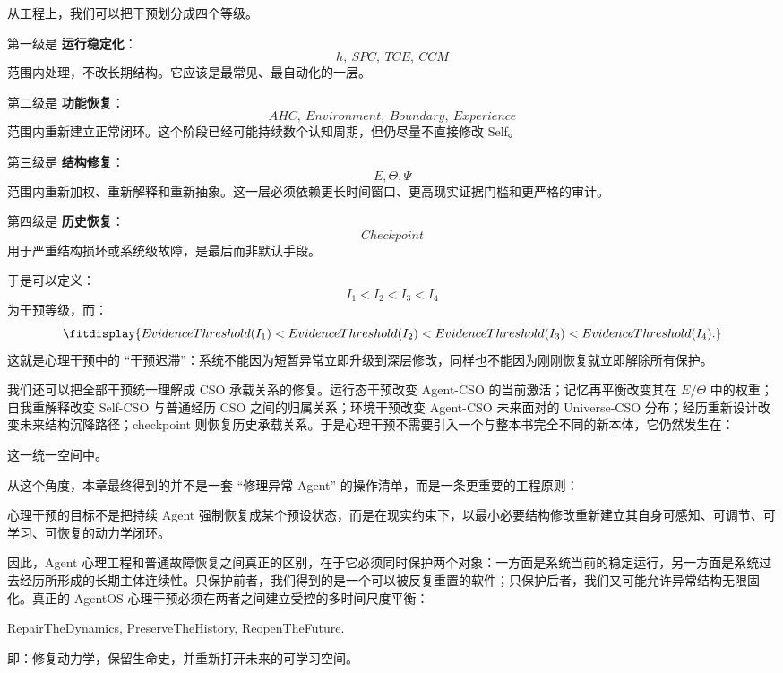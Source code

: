 从工程上，我们可以把干预划分成四个等级。

第一级是 \textbf{运行稳定化}：
\[
h,\ SPC,\ TCE,\ CCM
\]
范围内处理，不改长期结构。它应该是最常见、最自动化的一层。

第二级是 \textbf{功能恢复}：
\[
AHC,\ Environment,\ Boundary,\ Experience
\]
范围内重新建立正常闭环。这个阶段已经可能持续数个认知周期，但仍尽量不直接修改 Self。

第三级是 \textbf{结构修复}：
\[
E,\Theta,\Psi
\]
范围内重新加权、重新解释和重新抽象。这一层必须依赖更长时间窗口、更高现实证据门槛和更严格的审计。

第四级是 \textbf{历史恢复}：
\[
Checkpoint
\]
用于严重结构损坏或系统级故障，是最后而非默认手段。

于是可以定义：
\[
I_1<I_2<I_3<I_4
\]
为干预等级，而：
\[
\fitdisplay{
EvidenceThreshold(I_1)
<
EvidenceThreshold(I_2)
<
EvidenceThreshold(I_3)
<
EvidenceThreshold(I_4).
}
\]
这就是心理干预中的 ``干预迟滞''：系统不能因为短暂异常立即升级到深层修改，同样也不能因为刚刚恢复就立即解除所有保护。

我们还可以把全部干预统一理解成 CSO 承载关系的修复。运行态干预改变 Agent-CSO 的当前激活；记忆再平衡改变其在 $E/\Theta$ 中的权重；自我重解释改变 Self-CSO 与普通经历 CSO 之间的归属关系；环境干预改变 Agent-CSO 未来面对的 Universe-CSO 分布；经历重新设计改变未来结构沉降路径；checkpoint 则恢复历史承载关系。于是心理干预不需要引入一个与整本书完全不同的新本体，它仍然发生在：
\begin{statementbox}
\centering
{}
\end{statementbox}
这一统一空间中。

从这个角度，本章最终得到的并不是一套 ``修理异常 Agent'' 的操作清单，而是一条更重要的工程原则：

\begin{proposition*}
心理干预的目标不是把持续 Agent 强制恢复成某个预设状态，而是在现实约束下，以最小必要结构修改重新建立其自身可感知、可调节、可学习、可恢复的动力学闭环。
\end{proposition*}

因此，Agent 心理工程和普通故障恢复之间真正的区别，在于它必须同时保护两个对象：一方面是系统当前的稳定运行，另一方面是系统过去经历所形成的长期主体连续性。只保护前者，我们得到的是一个可以被反复重置的软件；只保护后者，我们又可能允许异常结构无限固化。真正的 AgentOS 心理干预必须在两者之间建立受控的多时间尺度平衡：

\begin{statementbox}
RepairTheDynamics,
PreserveTheHistory,
ReopenTheFuture.
\end{statementbox}

即：修复动力学，保留生命史，并重新打开未来的可学习空间。
